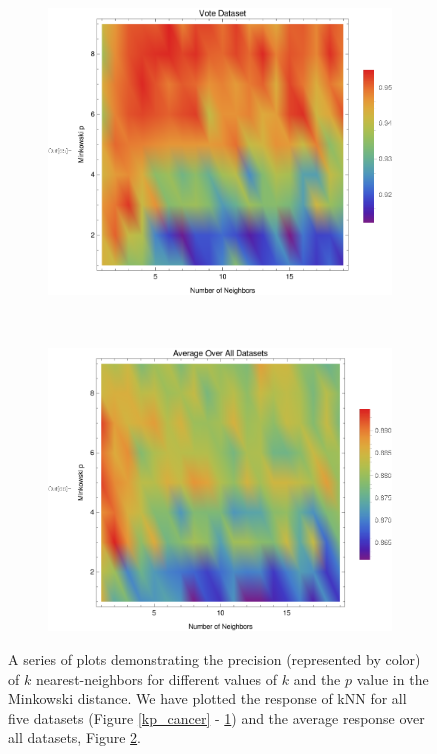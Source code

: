 \documentclass{article}
\begin{document}
\begin{figure}[h!]
\begin{subfigure}[b]{0.32\textwidth}
				\centering
				\includegraphics[width=\textwidth]{figs/kNN/vote_plot_kp}	
				\caption{}
				\label{kp_vote}				
			\end{subfigure} \	
			\begin{subfigure}[b]{0.32\textwidth}
				\centering
				\includegraphics[width=\textwidth]{figs/kNN/average_plot_kp}	
				\caption{}
				\label{kp_ave}				
			\end{subfigure}
			\caption{A series of plots demonstrating the precision (represented by color) of $k$ nearest-neighbors for different values of $k$ and the $p$ value in the Minkowski distance. We have plotted the response of kNN for all five datasets (Figure \ref{kp_cancer} - \ref{kp_vote}) and the average response over all datasets, Figure \ref{kp_ave}.}
			\label{kp_plot}
		\end{figure}
		
\end{document}
